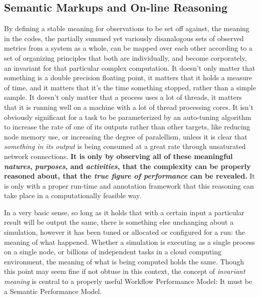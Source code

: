 \subsection{Semantic Markups and On-line Reasoning}
By defining a stable meaning for observations to be
set off against, the meaning in the codes, the partially summed yet
variously disanalogous sets of observed metrics from a system as a
whole, can be mapped over each other according to a set of organizing
principles that both are individually, and become corporately, an
invariant for that particular complex computation.
%
It doesn't only matter that something is a double precision floating
point, it matters that it holds a measure of time, and it matters that
it's the time something stopped, rather than a simple sample.
%
It doesn't only matter that a process uses a lot of threads, it
matters that it is running well on a machine with a lot of thread
processing cores.
%
It isn't obviously significant for a task to be parameterized by an
auto-tuning algorithm to increase the rate of one of its outputs
rather than other targets, like reducing node memory use, or
increasing the degree of paralellism, unless it is clear that
\textit{something in its output} is being consumed at a great rate
through unsaturated network connections.
%
\textbf{It is only by observing all of these meaningful
  \textit{natures}, \textit{purposes}, and \textit{activities}, that
  the complexity can be properly reasoned about, that the \textit{true
    figure of performance} can be revealed.}
%
It is only with a proper run-time and annotation framework that this
reasoning can take place in a computationally feasible way.

In a very basic sense, so long as it holds that with a certain input a
particular result will be output the same, there is something else
unchanging about a simulation, however it has been tuned or allocated
or configured for a run: the meaning of what happened.
%
Whether a simulation is executing as a single process on a single
node, or billions of independent tasks in a cloud computing
environment, the meaning of what is being computed holds the
same.
%
Though this point may seem fine if not obtuse in this context, the
concept of \textit{invariant meaning} is central to a properly useful
Workflow Performance Model: It must be a Semantic Performance Model.

